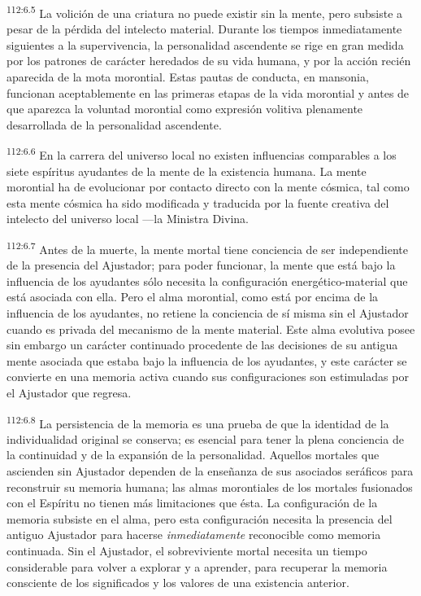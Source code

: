 \documentclass[twoside, 11pt]{book}
\begin{document}
\par
\textsuperscript{112:6.5} La volición de una criatura no puede existir sin la mente, pero subsiste a pesar de la pérdida del intelecto material. Durante los tiempos inmediatamente siguientes a la supervivencia, la personalidad ascendente se rige en gran medida por los patrones de carácter heredados de su vida humana, y por la acción recién aparecida de la mota morontial. Estas pautas de conducta, en mansonia, funcionan aceptablemente en las primeras etapas de la vida morontial y antes de que aparezca la voluntad morontial como expresión volitiva plenamente desarrollada de la personalidad ascendente.

\par
\textsuperscript{112:6.6} En la carrera del universo local no existen influencias comparables a los siete espíritus ayudantes de la mente de la existencia humana. La mente morontial ha de evolucionar por contacto directo con la mente cósmica, tal como esta mente cósmica ha sido modificada y traducida por la fuente creativa del intelecto del universo local ---la Ministra Divina.

\par
\textsuperscript{112:6.7} Antes de la muerte, la mente mortal tiene conciencia de ser independiente de la presencia del Ajustador; para poder funcionar, la mente que está bajo la influencia de los ayudantes sólo necesita la configuración energético-material que está asociada con ella. Pero el alma morontial, como está por encima de la influencia de los ayudantes, no retiene la conciencia de sí misma sin el Ajustador cuando es privada del mecanismo de la mente material. Este alma evolutiva posee sin embargo un carácter continuado procedente de las decisiones de su antigua mente asociada que estaba bajo la influencia de los ayudantes, y este carácter se convierte en una memoria activa cuando sus configuraciones son estimuladas por el Ajustador que regresa.

\par
\textsuperscript{112:6.8} La persistencia de la memoria es una prueba de que la identidad de la individualidad original se conserva; es esencial para tener la plena conciencia de la continuidad y de la expansión de la personalidad. Aquellos mortales que ascienden sin Ajustador dependen de la enseñanza de sus asociados seráficos para reconstruir su memoria humana; las almas morontiales de los mortales fusionados con el Espíritu no tienen más limitaciones que ésta. La configuración de la memoria subsiste en el alma, pero esta configuración necesita la presencia del antiguo Ajustador para hacerse \textit{inmediatamente} reconocible como memoria continuada. Sin el Ajustador, el sobreviviente mortal necesita un tiempo considerable para volver a explorar y a aprender, para recuperar la memoria consciente de los significados y los valores de una existencia anterior.
\end{document}
